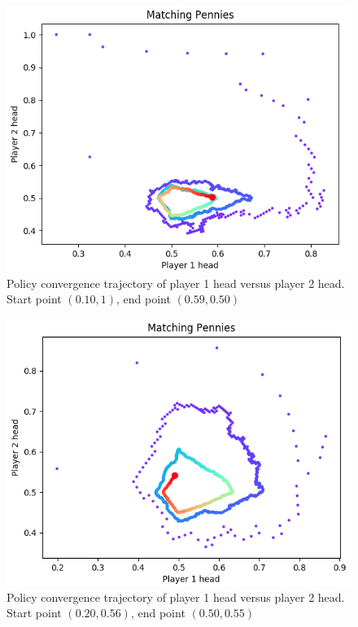 \documentclass[journal]{IEEEtran}
\begin{document}
\begin{figure}[!t]
\centering
\includegraphics[scale=0.37]{figure/secondGameSecondPolicy1m.png}
\caption{Policy convergence trajectory of player 1 head versus player 2 head. Start point $(0.10, 1)$, end point $(0.59, 0.50)$}
\label{Fig:secondPolSecondGame9}
\end{figure}

\begin{figure}[!t]

\centering
\includegraphics[scale=0.37]{figure/secondGameSecondPolicy2m.png}
\caption{Policy convergence trajectory of player 1 head versus player 2 head. Start point $(0.20, 0.56)$, end point $(0.50, 0.55)$}
\label{Fig:secondPolSecondGame10}
\end{figure}
\end{document}
